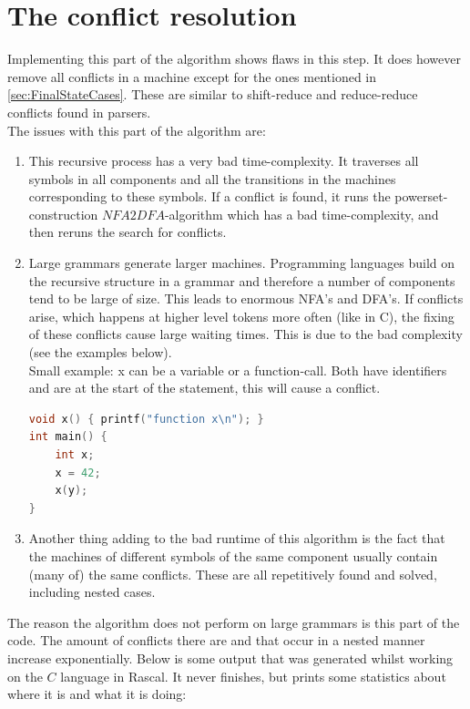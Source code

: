\section{The conflict resolution}
Implementing this part of the algorithm shows flaws in this step. It does however remove all conflicts in a machine except for the ones mentioned in \ref{sec:FinalStateCases}. These are similar to shift-reduce and reduce-reduce conflicts found in parsers.\\
The issues with this part of the algorithm are: 
\begin{enumerate}
\item This recursive process has a very bad time-complexity. It traverses all symbols in all components and all the transitions in the machines corresponding to these symbols. If a conflict is found, it runs the powerset-construction $NFA2DFA$-algorithm which has a bad time-complexity, and then reruns the search for conflicts.
\item Large grammars generate larger machines. Programming languages build on the recursive structure in a grammar and therefore a number of components tend to be large of size. This leads to enormous NFA's and DFA's. If conflicts arise, which happens at higher level tokens more often (like  in C), the fixing of these conflicts cause large waiting times. This is due to the bad complexity (see the examples below).\\
Small example: x can be a variable or a function-call. Both have identifiers and are at the start of the statement, this will cause a conflict. 
\begin{lstlisting}[language=C]
void x() { printf("function x\n"); }
int main() {
	int x;
	x = 42;
	x(y);
}
\end{lstlisting}  
\item Another thing adding to the bad runtime of this algorithm is the fact that the machines of different symbols of the same component usually contain (many of) the same conflicts. These are all repetitively found and solved, including nested cases.
\end{enumerate}
\pagebreak
The reason the algorithm does not perform on large grammars is this part of the code. The amount of conflicts there are and that occur in a nested manner increase exponentially. Below is some output that was generated whilst working on the $C$ language in Rascal. It never finishes, but prints some statistics about where it is and what it is doing:

